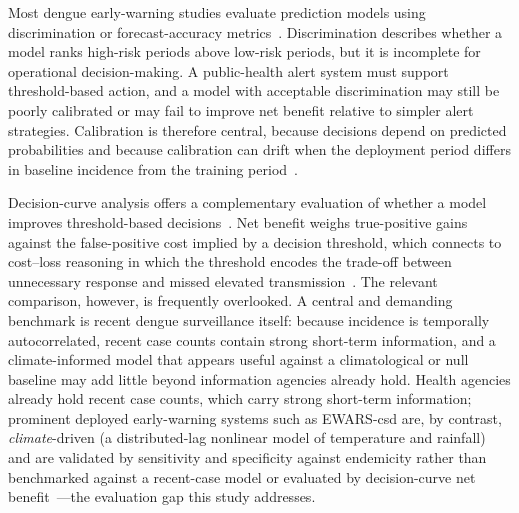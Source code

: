 \documentclass[11pt,a4paper]{article}
\begin{document}
Most dengue early-warning studies evaluate prediction models using discrimination or forecast-accuracy metrics~\cite{Johansson2019,Baharom2022,HussainAlkhateeb2021,Lowe2021}. Discrimination describes whether a model ranks high-risk periods above low-risk periods, but it is incomplete for operational decision-making. A public-health alert system must support threshold-based action, and a model with acceptable discrimination may still be poorly calibrated or may fail to improve net benefit relative to simpler alert strategies. Calibration is therefore central, because decisions depend on predicted probabilities and because calibration can drift when the deployment period differs in baseline incidence from the training period~\cite{VanCalster2019,VanCalster2023,SteyerbergVergouwe2014}.

Decision-curve analysis offers a complementary evaluation of whether a model improves threshold-based decisions~\cite{Vickers2006,Vickers2016,Vickers2019}. Net benefit weighs true-positive gains against the false-positive cost implied by a decision threshold, which connects to cost--loss reasoning in which the threshold encodes the trade-off between unnecessary response and missed elevated transmission~\cite{Murphy1985,Tozan2023}. The relevant comparison, however, is frequently overlooked. A central and demanding benchmark is recent dengue surveillance itself: because incidence is temporally autocorrelated, recent case counts contain strong short-term information, and a climate-informed model that appears useful against a climatological or null baseline may add little beyond information agencies already hold. Health agencies already hold recent case counts, which carry strong short-term information; prominent deployed early-warning systems such as EWARS-csd are, by contrast, \emph{climate}-driven (a distributed-lag nonlinear model of temperature and rainfall) and are validated by sensitivity and specificity against endemicity rather than benchmarked against a recent-case model or evaluated by decision-curve net benefit~\cite{EWARScsd}---the evaluation gap this study addresses.
\end{document}
